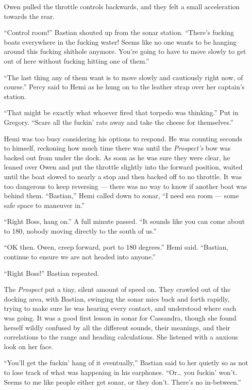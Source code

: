 \documentclass[
]{scrbook}
\begin{document}
Owen pulled the throttle controls backwards, and they felt a small
acceleration towards the rear.

``Control room!'' Bastian shouted up from the sonar station. ``There's
fucking boats everywhere in the fucking water! Seems like no one wants
to be hanging around this fucking shithole anymore. You're going to have
to move slowly to get out of here without fucking hitting one of them.''

``The last thing any of them want is to move slowly and cautiously right
now, of course.'' Percy said to Hemi as he hung on to the leather strap
over her captain's station.

``That might be exactly what whoever fired that torpedo was thinking.''
Put in Gregory. ``Scare all the fuckin' rats away and take the cheese
for themselves.''

Hemi was too busy considering his options to respond. He was counting
seconds to himself, reckoning how much time there was until the
\emph{Prospect's} bow was backed out from under the dock. As soon as he
was sure they were clear, he leaned over Owen and put the throttle
slightly into the forward position, waited until the boat slowed to
nearly a stop and then backed off to no throttle. It was too dangerous
to keep reversing --- there was no way to know if another boat was
behind them. ``Bastian,'' Hemi called down to sonar, ``I need sea room
--- some safe space to maneuver in.''

``Right Boss, hang on.'' A full minute passed. ``It sounds like you can
come about to 180, nobody moving directly to the south of us.''

``OK then. Owen, creep forward, port to 180 degrees.'' Hemi said.
``Bastian, continue to ensure we are not headed into anyone.''

``Right Boss!'' Bastian repeated.

The \emph{Prospect} put a tiny, silent amount of speed on. They crawled
out of the docking area, with Bastian, swinging the sonar mics back and
forth rapidly, trying to make sure he was hearing every contact, and
understood where each was going. It was a good first lesson in sonar for
Cassandra, though she found herself wildly confused by all the different
sounds, their meanings, and their correlations to the range and heading
calculations. She listened with a anxious look on her face.

``You'll get the fuckin' hang of it eventually,'' Bastian said to her
quietly so as not to lose track of what was happening in his earphones.
``Or\ldots{} you fuckin' won't. Seems to me like people either get
sonar, or they don't. There's no in-between.''
\end{document}

